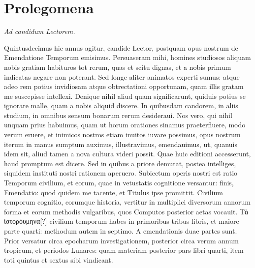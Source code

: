 

\chapter{Prolegomena}
\begin{center}
\em{Ad candidum Lectorem.}
\end{center}

Quintusdecimus hic annus agitur, candide
Lector, postquam opus nostrum de
Emendatione Temporum emisimus.
Persuaseram
mihi, homines studiosos aliquam nobis
gratiam habituros tot rerum, quas et scitu
dignas, et a nobis primum indicatas negare
non poterant.
Sed longe aliter animatos experti
sumus: atque adeo rem potius invidiosam
atque obtrectationi opportunam, quam illis gratam me suscepisse
intellexi.
Denique nihil aliud quam significarunt, quiduis potius
se ignorare malle, quam a nobis aliquid discere.
In quibusdam
candorem, in aliis studium, in omnibus sensum bonarum rerum desideraui.
Nos vero, qui nihil unquam prius habuimus, quam ut horum
orationes sinamus praeterfluere, modo verum eruere, et inimicos
nostros etiam inuitos iuvare possimus, opus nostrum iterum in
manus sumptum auximus, illustravimus, emendauimus, ut, quanuis
idem sit, aliud tamen a nova cultura videri possit.
Quae huic editioni
accesserunt, haud promptum est dicere.
Sed in quibus a priore demutat,
postea intelliges, siquidem instituti nostri rationem aperuero.
Subiectum operis nostri est ratio Temporum civilium, et eorum,
quae in vetustatis cognitione versantur: finis, Emendatio: quod quidem
me tacente, et Titulus ipse promittit.
Civilium temporum cognitio,
eorumque historia, vertitur in multiplici diversorum annorum
forma et eorum methodis vulgaribus, quos Computos posterior
aetas vocauit.
\textgreek{Τὰ ἱστορόυμηνα[?]} civilium temporum habes in primoribus
tribus libris, et maiore parte quarti: methodum autem in septimo.
A emendationis duae partes sunt.
Prior versatur circa epocharum
investigationem, posterior circa verum annum tropicum, 
et periodos Lunares: quam materiam posterior pars libri quarti,
item toti quintus et sextus sibi vindicant.

